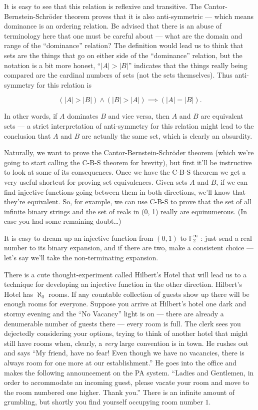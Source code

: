 It is easy to see that this relation is reflexive and transitive.  The Cantor-
Bernstein-Schr\"{o}der theorem proves that it is also anti-symmetric --- which
means dominance is an ordering relation.  Be advised that there is an abuse
of terminology here that one must be careful about --- what are the domain
and range of the ``dominance'' relation?  The definition would lead us to
think that sets are the things that go on either side of the ``dominance''
relation, but the notation is a bit more honest, ``$|A| > |B|$'' 
indicates that the
things really being compared are the cardinal numbers of sets (not the sets
themselves).  Thus anti-symmetry for this relation is

\[ (|A| > |B|) \land (|B| > |A|) \implies (|A| = |B|). \]

In other words, if $A$ dominates $B$ and vice versa, then $A$ and $B$ are
equivalent sets --- a strict interpretation of anti-symmetry for this relation
might lead to the conclusion that $A$ and $B$ are actually the same set, which
is clearly an absurdity.

Naturally, we want to prove the Cantor-Bernstein-Schr\"{o}der theorem (which
we're going to start calling the C-B-S theorem for brevity), but first it'll be
instructive to look at some of its consequences. Once we have the C-B-S
theorem we get a very useful shortcut for proving set equivalences. Given
sets $A$ and $B$, if we can find injective functions going between them in both
directions, we'll know that they're equivalent. So, for example, we can use
C-B-S to prove that the set of all infinite binary strings and the set of reals
in (0, 1) really are equinumerous.  
(In case you had some remaining doubt\ldots )

It is easy to dream up an injective function from $(0, 1)$ 
to ${\mathbb F}_2^\infty$ : just send a
real number to its binary expansion, and if there are two, make a consistent
choice --- let's say we'll take the non-terminating expansion.

There is a cute thought-experiment called Hilbert's Hotel that will lead
us to a technique for developing an injective function in the other direction.
Hilbert's Hotel has $\aleph_0$ rooms. If any countable collection of 
guests show up there will be enough rooms for everyone.   Suppose you 
arrive at Hilbert's hotel one dark and stormy evening and the 
``No Vacancy'' light is on --- there are already a
denumerable number of guests there --- every room is full. The clerk 
sees you dejectedly considering your options, trying to think of 
another hotel that might still have rooms when, clearly, a \emph{very} 
large convention is in town.  He rushes out and says 
``My friend, have no fear! Even though we have no vacancies,
there is always room for one more at our establishment.''  
He goes into the office and makes the following announcement 
on the PA system.  ``Ladies and Gentlemen, in order to accommodate 
an incoming guest, please vacate your room and move to the room 
numbered one higher. Thank you.''  There
is an infinite amount of grumbling, but shortly you find yourself occupying
room number $1$.

